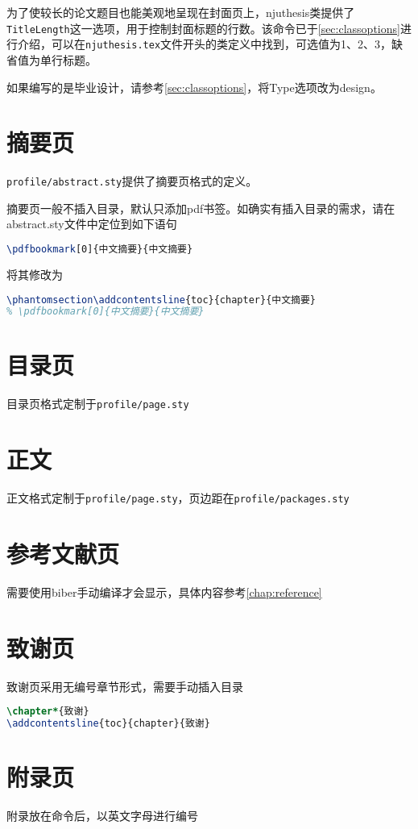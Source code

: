 为了使较长的论文题目也能美观地呈现在封面页上，njuthesis类提供了\texttt{TitleLength}这一选项，用于控制封面标题的行数。该命令已于\cref{sec:classoptions}进行介绍，可以在\texttt{njuthesis.tex}文件开头的类定义中找到，可选值为1、2、3，缺省值为单行标题。

如果编写的是毕业设计，请参考\cref{sec:classoptions}，将Type选项改为design。

\section{摘要页}

\texttt{profile/abstract.sty}提供了摘要页格式的定义。

摘要页一般不插入目录，默认只添加pdf书签。如确实有插入目录的需求，请在abstract.sty文件中定位到如下语句
\begin{lstlisting}[language=TeX]
% \phantomsection\addcontentsline{toc}{chapter}{中文摘要}
\pdfbookmark[0]{中文摘要}{中文摘要}
\end{lstlisting}
将其修改为
\begin{lstlisting}[language=TeX]
\phantomsection\addcontentsline{toc}{chapter}{中文摘要}
% \pdfbookmark[0]{中文摘要}{中文摘要}
\end{lstlisting}

\section{目录页}

目录页格式定制于\texttt{profile/page.sty}

\section{正文}

正文格式定制于\texttt{profile/page.sty}，页边距在\texttt{profile/packages.sty}

\section{参考文献页}

需要使用biber手动编译才会显示，具体内容参考\cref{chap:reference}

\section{致谢页}

致谢页采用无编号章节形式，需要手动插入目录
\begin{lstlisting}[language=TeX]
\chapter*{致谢}
\addcontentsline{toc}{chapter}{致谢}
\end{lstlisting}

\section{附录页}

附录放在\texttt{\appendix}命令后，以英文字母进行编号
